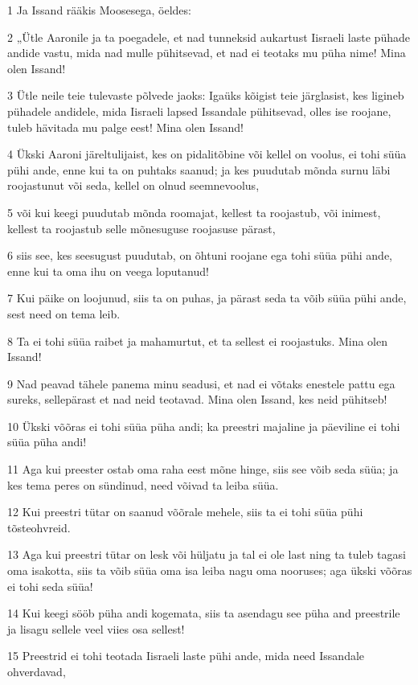 \par 1 Ja Issand rääkis Moosesega, öeldes:
\par 2 „Ütle Aaronile ja ta poegadele, et nad tunneksid aukartust Iisraeli laste pühade andide vastu, mida nad mulle pühitsevad, et nad ei teotaks mu püha nime! Mina olen Issand!
\par 3 Ütle neile teie tulevaste põlvede jaoks: Igaüks kõigist teie järglasist, kes ligineb pühadele andidele, mida Iisraeli lapsed Issandale pühitsevad, olles ise roojane, tuleb hävitada mu palge eest! Mina olen Issand!
\par 4 Ükski Aaroni järeltulijaist, kes on pidalitõbine või kellel on voolus, ei tohi süüa pühi ande, enne kui ta on puhtaks saanud; ja kes puudutab mõnda surnu läbi roojastunut või seda, kellel on olnud seemnevoolus,
\par 5 või kui keegi puudutab mõnda roomajat, kellest ta roojastub, või inimest, kellest ta roojastub selle mõnesuguse roojasuse pärast,
\par 6 siis see, kes seesugust puudutab, on õhtuni roojane ega tohi süüa pühi ande, enne kui ta oma ihu on veega loputanud!
\par 7 Kui päike on loojunud, siis ta on puhas, ja pärast seda ta võib süüa pühi ande, sest need on tema leib.
\par 8 Ta ei tohi süüa raibet ja mahamurtut, et ta sellest ei roojastuks. Mina olen Issand!
\par 9 Nad peavad tähele panema minu seadusi, et nad ei võtaks enestele pattu ega sureks, sellepärast et nad neid teotavad. Mina olen Issand, kes neid pühitseb!
\par 10 Ükski võõras ei tohi süüa püha andi; ka preestri majaline ja päeviline ei tohi süüa püha andi!
\par 11 Aga kui preester ostab oma raha eest mõne hinge, siis see võib seda süüa; ja kes tema peres on sündinud, need võivad ta leiba süüa.
\par 12 Kui preestri tütar on saanud võõrale mehele, siis ta ei tohi süüa pühi tõsteohvreid.
\par 13 Aga kui preestri tütar on lesk või hüljatu ja tal ei ole last ning ta tuleb tagasi oma isakotta, siis ta võib süüa oma isa leiba nagu oma nooruses; aga ükski võõras ei tohi seda süüa!
\par 14 Kui keegi sööb püha andi kogemata, siis ta asendagu see püha and preestrile ja lisagu sellele veel viies osa sellest!
\par 15 Preestrid ei tohi teotada Iisraeli laste pühi ande, mida need Issandale ohverdavad,
